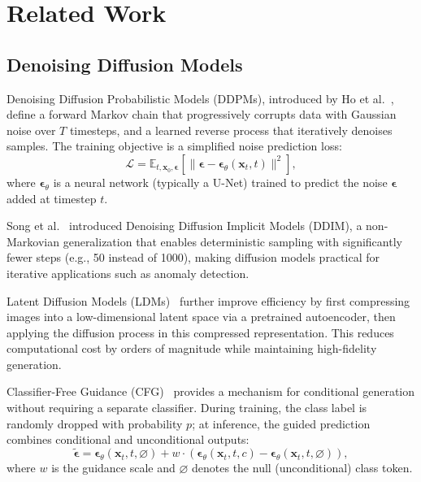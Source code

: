 \section{Related Work}
\label{sec:related_work}

\subsection{Denoising Diffusion Models}

Denoising Diffusion Probabilistic Models (DDPMs), introduced by Ho et al.~\cite{ho2020denoising}, define a forward Markov chain that progressively corrupts data with Gaussian noise over $T$ timesteps, and a learned reverse process that iteratively denoises samples. The training objective is a simplified noise prediction loss:
\begin{equation}
\mathcal{L} = \mathbb{E}_{t, \mathbf{x}_0, \boldsymbol{\epsilon}} \left[ \| \boldsymbol{\epsilon} - \boldsymbol{\epsilon}_\theta(\mathbf{x}_t, t) \|^2 \right],
\label{eq:ddpm_loss}
\end{equation}
where $\boldsymbol{\epsilon}_\theta$ is a neural network (typically a U-Net) trained to predict the noise $\boldsymbol{\epsilon}$ added at timestep $t$.

Song et al.~\cite{song2021denoising} introduced Denoising Diffusion Implicit Models (DDIM), a non-Markovian generalization that enables deterministic sampling with significantly fewer steps (e.g., 50 instead of 1000), making diffusion models practical for iterative applications such as anomaly detection.

Latent Diffusion Models (LDMs)~\cite{rombach2022high} further improve efficiency by first compressing images into a low-dimensional latent space via a pretrained autoencoder, then applying the diffusion process in this compressed representation. This reduces computational cost by orders of magnitude while maintaining high-fidelity generation.

Classifier-Free Guidance (CFG)~\cite{ho2022classifier} provides a mechanism for conditional generation without requiring a separate classifier. During training, the class label is randomly dropped with probability $p$; at inference, the guided prediction combines conditional and unconditional outputs:
\begin{equation}
\tilde{\boldsymbol{\epsilon}} = \boldsymbol{\epsilon}_\theta(\mathbf{x}_t, t, \varnothing) + w \cdot \left( \boldsymbol{\epsilon}_\theta(\mathbf{x}_t, t, c) - \boldsymbol{\epsilon}_\theta(\mathbf{x}_t, t, \varnothing) \right),
\label{eq:cfg}
\end{equation}
where $w$ is the guidance scale and $\varnothing$ denotes the null (unconditional) class token.

